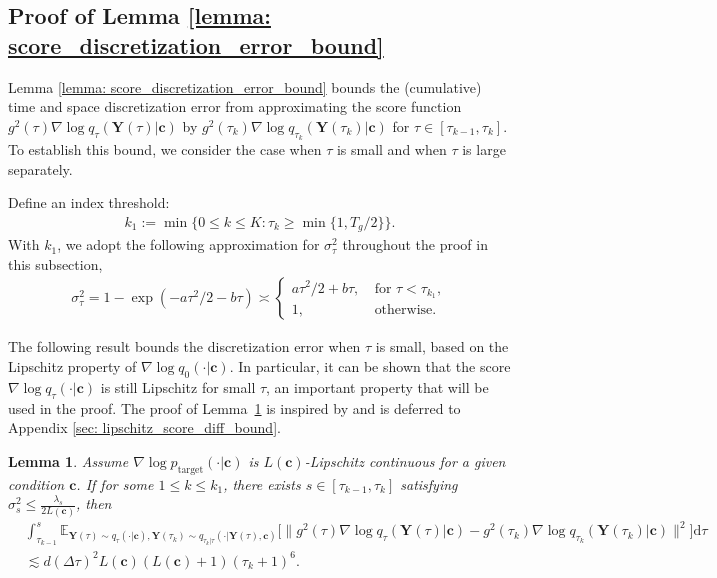 \documentclass[11pt]{article}
\newtheorem{lemma}{Lemma}
\newcommand{\mE}{\mathbb{E}}
\newcommand{\bY}{\mathbf{Y}}
\newcommand{\bc}{\mathbf{c}}
\newcommand{\tar}{{\text{target}}}
\newcommand{\intd}{\mathrm{d}}
\begin{document}
\subsection{Proof of Lemma \ref{lemma: score_discretization_error_bound}}\label{sec: score_discretization_error}
Lemma \ref{lemma: score_discretization_error_bound} bounds the (cumulative) time and space discretization error from approximating the score function $g^2(\tau)\nabla\log q_{\tau}(\bY(\tau)|\bc)$ by $g^2(\tau_k)\nabla\log q_{\tau_k}(\bY(\tau_k)| \bc)$ for $\tau\in[\tau_{k - 1}, \tau_k]$. To establish this bound, we consider the case when $\tau$ is small and when $\tau$ is large separately.

Define an index threshold:
\begin{align}\label{eq: expoenential_threshold}
    k_1 := \min\{0\le k \le K: \tau_k \ge \min\{1, T_g/2\}\}.
\end{align}
With $k_1$, we adopt the following approximation for $\sigma_\tau^2$ throughout the proof in this subsection,
\begin{align}\label{eq: expoenetial_approximation}
    \sigma_\tau^2 = 1 - \exp(-a\tau^2/2 - b\tau) \asymp \begin{cases}
        a\tau^2/2 + b\tau,\ &\text{for } \tau < \tau_{k_1},\\
        1,& \text{otherwise}.
    \end{cases}
\end{align}

The following result bounds the discretization error when $\tau$ is small, based on the Lipschitz property of $\nabla\log q_0(\cdot | \bc)$. In particular, it can be shown that the score $\nabla\log q_\tau(\cdot | \bc)$ is still Lipschitz for small $\tau$, an important property that will be used in the proof. The proof of Lemma~\ref{lemma: lipschitz_score_diff_bound} is inspired by \cite{chen2023improved} and is deferred to Appendix \ref{sec: lipschitz_score_diff_bound}.



\begin{lemma}\label{lemma: lipschitz_score_diff_bound}
    Assume $\nabla\log p_\tar(\cdot|\bc)$ is $L(\bc)$-Lipschitz continuous for a given condition $\bc$. If for some $1\le k \le k_1$, there exists $s \in [\tau_{k - 1}, \tau_k]$ satisfying $\sigma_{s}^2\le \frac{\lambda_{s}}{2L(\bc)}$, then
    \begin{align*}
        & \int_{\tau_{k - 1}}^{s}\mE_{\bY(\tau)\sim q_\tau(\cdot | \bc), \bY(\tau_k)\sim q_{\tau_k | \tau}(\cdot | \bY(\tau), \bc)}\big[\|g^2(\tau)\nabla\log q_\tau(\bY(\tau) | \bc) - g^2(\tau_k)\nabla\log q_{\tau_k}(\bY(\tau_k) | \bc)\|^2\big]\intd \tau\\
        &\lesssim d(\Delta\tau)^2L(\bc)(L(\bc) + 1)(\tau_k + 1)^6.
    \end{align*}
\end{lemma}
\end{document}
